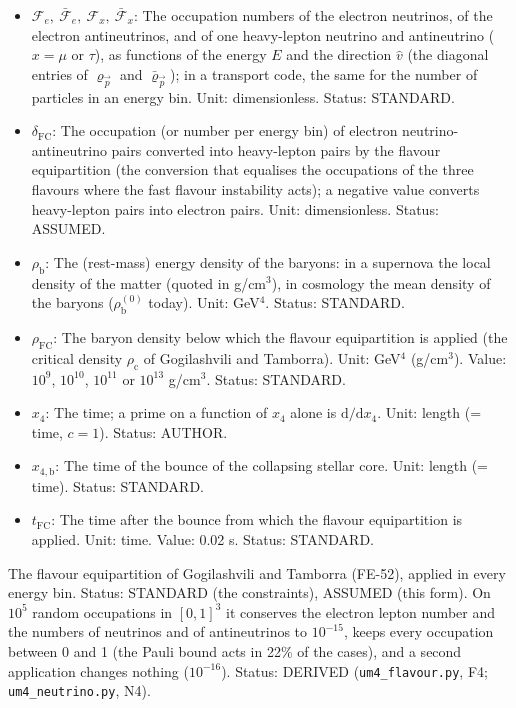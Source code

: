 \documentclass[
  10pt,
]{article}
\providecommand{\tightlist}{%
  \setlength{\itemsep}{0pt}\setlength{\parskip}{0pt}}
\begin{document}
\begin{itemize}
\tightlist
\item
  \(\mathcal{F}_{e},\ \bar{\mathcal{F}}_{e},\ \mathcal{F}_{x},\ \bar{\mathcal{F}}_{x}\):
  The occupation numbers of the electron neutrinos, of the electron
  antineutrinos, and of one heavy-lepton neutrino and antineutrino
  (\(x = \mu\) or \(\tau\)), as functions of the energy \(E\) and the
  direction \(\hat v\) (the diagonal entries of \(\varrho_{\vec p}\) and
  \(\bar\varrho_{\vec p}\)); in a transport code, the same for the
  number of particles in an energy bin. Unit: dimensionless. Status:
  STANDARD.
\item
  \(\delta_{\mathrm{FC}}\): The occupation (or number per energy bin) of
  electron neutrino-antineutrino pairs converted into heavy-lepton pairs
  by the flavour equipartition (the conversion that equalises the
  occupations of the three flavours where the fast flavour instability
  acts); a negative value converts heavy-lepton pairs into electron
  pairs. Unit: dimensionless. Status: ASSUMED.
\item
  \(\rho_{\mathrm{b}}\): The (rest-mass) energy density of the baryons:
  in a supernova the local density of the matter (quoted in g/cm\(^3\)),
  in cosmology the mean density of the baryons
  (\(\rho_{\mathrm{b}}^{(0)}\) today). Unit: GeV\(^4\). Status:
  STANDARD.
\item
  \(\rho_{\mathrm{FC}}\): The baryon density below which the flavour
  equipartition is applied (the critical density \(\rho_{\mathrm{c}}\)
  of Gogilashvili and Tamborra). Unit: GeV\(^4\) (g/cm\(^3\)). Value:
  \(10^9\), \(10^{10}\), \(10^{11}\) or \(10^{13}\) g/cm\(^3\). Status:
  STANDARD.
\item
  \(x_4\): The time; a prime on a function of \(x_4\) alone is
  \(\mathrm{d}/\mathrm{d}x_4\). Unit: length (= time, \(c = 1\)).
  Status: AUTHOR.
\item
  \(x_{4,\mathrm{b}}\): The time of the bounce of the collapsing stellar
  core. Unit: length (= time). Status: STANDARD.
\item
  \(t_{\mathrm{FC}}\): The time after the bounce from which the flavour
  equipartition is applied. Unit: time. Value: 0.02 s. Status: STANDARD.
\end{itemize}

The flavour equipartition of Gogilashvili and Tamborra (FE-52), applied
in every energy bin. Status: STANDARD (the constraints), ASSUMED (this
form). On \(10^5\) random occupations in \([0, 1]^3\) it conserves the
electron lepton number and the numbers of neutrinos and of antineutrinos
to \(10^{-15}\), keeps every occupation between 0 and 1 (the Pauli bound
acts in 22\% of the cases), and a second application changes nothing
(\(10^{-16}\)). Status: DERIVED (\texttt{um4\_flavour.py}, F4;
\texttt{um4\_neutrino.py}, N4).
\end{document}
